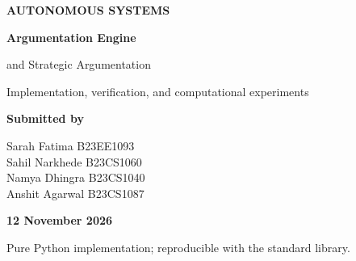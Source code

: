 \documentclass[11pt,a4paper]{article}
\begin{document}
\begin{titlepage}
\thispagestyle{empty}
\vspace*{1.15cm}
{\color{white}\Large\bfseries AUTONOMOUS SYSTEMS\par}
\vspace{1.4cm}
{\color{white}\Huge\bfseries Argumentation Engine\par}
\vspace{0.25cm}
{\color{white}\LARGE and Strategic Argumentation\par}
\vspace{0.7cm}
{\color{white}\large Implementation, verification, and computational experiments\par}
\vspace{5.5cm}
\begin{minipage}{0.78\textwidth}
{\large\bfseries Submitted by}\par
\vspace{0.25cm}
Sarah Fatima \hfill B23EE1093\\
Sahil Narkhede \hfill B23CS1060\\
Namya Dhingra \hfill B23CS1040\\
Anshit Agarwal \hfill B23CS1087
\end{minipage}
\vfill
{\large\bfseries 12 November 2026\par}
\vspace{0.4cm}
{\color{muted}Pure Python implementation; reproducible with the standard library.\par}
\end{titlepage}

\begin{abstract}
This project implements a complete small-framework engine for Dung-style abstract argumentation and studies strategic reporting under the grounded direct argumentation mechanism. The framework engine computes admissible and complete sets, grounded, preferred, stable, and semi-stable extensions, legal in/out/undec labellings, and acceptance statuses. The strategic component evaluates reports, enumerates best responses, checks the truthfulness inequality of Theorem~5.3, and tests the odd-path condition of Theorem~5.4, including two explicit interpretations of paths in cyclic graphs.

The implementation is validated against the book's Examples~5.10 and~5.11, hand-constructed semantic cases, and randomized cross-checks. The experiments evaluate 1,000 random instances for each of three attack probabilities. For the main no-self-attack setting, the measured strategyproof fractions are 0.632, 0.317, and 0.126 for $p=0.15,0.25,0.35$, respectively. No sampled instance satisfied the Theorem~5.4 condition while failing strategyproofness. Conversely, many instances remained strategyproof even though the sufficient condition failed, illustrating that the condition is not necessary.
\end{abstract}
\end{document}
